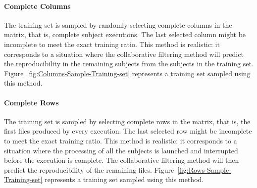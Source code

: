 \documentclass[10pt, conference, compsocconf]{IEEEtran}
\begin{document}
\paragraph{Complete Columns}
The training set is sampled by randomly selecting complete columns in
the matrix, that is, complete subject executions. The last selected
column might be incomplete to meet the exact training ratio. This 
method is realistic: it corresponds to a situation where the 
collaborative filtering method will predict the reproducibility in the 
remaining subjects from the subjects in the training set. 
Figure~\ref{fig:Columns-Sample-Training-set} represents a training set 
sampled using this method.


\paragraph{Complete Rows} The training set is sampled by selecting complete 
rows in the matrix, that is, the first files produced by
every execution. The last selected row might be incomplete to meet the
exact training ratio. This method is realistic: it corresponds to a 
situation where the processing of all the subjects is launched and 
interrupted before the execution is complete. The collaborative 
filtering method will then predict the reproducibility of the remaining 
files. Figure~\ref{fig:Rows-Sample-Training-set} represents a training 
set sampled using this method.
\end{document}
